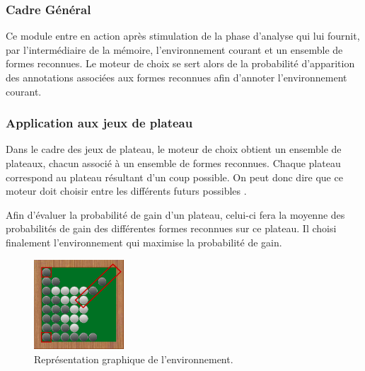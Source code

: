 \subsubsection{Cadre Général}

Ce module entre en action après stimulation de la phase d'analyse qui lui fournit, par l'intermédiaire de la mémoire, l'environnement courant et un ensemble de formes reconnues. Le \og moteur de choix \fg{} se sert alors de la probabilité d'apparition des annotations associées aux formes reconnues afin d'annoter l'environnement courant.

\subsubsection{Application aux jeux de plateau}

Dans le cadre des jeux de plateau, le moteur de choix obtient un ensemble de plateaux, chacun associé à un ensemble de formes reconnues. Chaque plateau correspond au plateau résultant d'un coup possible. On peut donc dire que ce moteur doit choisir entre les différents \og futurs possibles \fg{}.

Afin d'évaluer la probabilité de gain d'un plateau, celui-ci fera la moyenne des probabilités de gain des différentes formes reconnues sur ce plateau. Il choisi finalement l'environnement qui maximise la probabilité de gain.

\begin{figure}[H] 
  \begin{center}
		\includegraphics[width=0.3\textwidth]{files/raisonneur/moteur_de_choix} 
	\end{center}
\caption{Représentation graphique de l'environnement.} 
\label{img_env}
\end{figure}
